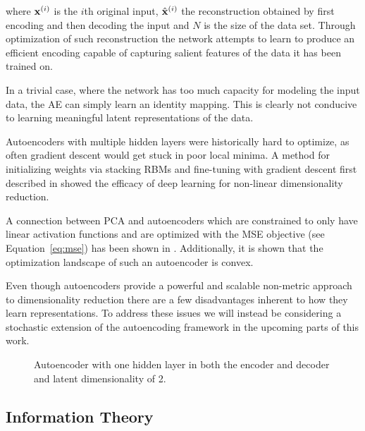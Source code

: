 where $\mathbf{x}^{(i)}$ is the $i$th original input, $\hat{\mathbf{x}}^{(i)}$ the reconstruction obtained by first encoding and then decoding the input and $N$ is the size of the data set. Through optimization of such reconstruction the network attempts to learn to produce an efficient encoding capable of capturing salient features of the data it has been trained on.

In a trivial case, where the network has too much capacity for modeling the input data, the AE can simply learn an identity mapping. This is clearly not conducive to learning meaningful latent representations of the data.


Autoencoders with multiple hidden layers were historically hard to optimize, as often gradient descent would get stuck in poor local minima. A method for initializing weights via stacking RBMs and fine-tuning with gradient descent first described in \cite{hinton_autoencoder} showed the efficacy of deep learning for non-linear dimensionality reduction.

A connection between PCA and autoencoders which are constrained to only have linear activation functions and are optimized with the MSE objective (see Equation~\ref{eq:mse}) has been shown in \cite{autoencoder_pca}. Additionally, it is shown that the optimization landscape of such an autoencoder is convex.

Even though autoencoders provide a powerful and scalable non-metric approach to dimensionality reduction there are a few disadvantages inherent to how they learn representations.  To address these issues we will instead be considering a stochastic extension of the autoencoding framework in the upcoming parts of this work.

\begin{figure}[!htb]
  \centering
  \resizebox{0.8\textwidth}{!}{\unskip}
  \caption{Autoencoder with one hidden layer in both the encoder and decoder and latent dimensionality of 2.}
  \label{fig:ae}
\end{figure}

\subsection{Information Theory}

